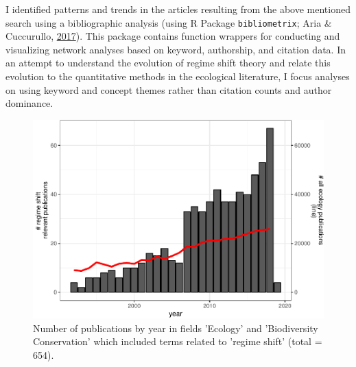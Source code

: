 \documentclass[12pt,twoside,openany]{reedthesis}
\begin{document}
I identified patterns and trends in the articles resulting from the above mentioned search using a bibliographic analysis (using R Package \texttt{bibliometrix}; Aria \& Cuccurullo, \protect\hyperlink{ref-bibliometrix}{2017}). This package contains function wrappers for conducting and visualizing network analyses based on keyword, authorship, and citation data. In an attempt to understand the evolution of regime shift theory and relate this evolution to the quantitative methods in the ecological literature, I focus analyses on using keyword and concept themes rather than citation counts and author dominance.
\begin{figure}
\includegraphics[width=0.85\linewidth]{_myDissertation_files/figure-latex/wosRegimePubsByYearwithNumEcolPubs-1} \caption{Number of publications by year in fields 'Ecology' and 'Biodiversity Conservation' which included terms related to 'regime shift' (total = 654).}\label{fig:wosRegimePubsByYearwithNumEcolPubs}
\end{figure}
\end{document}
